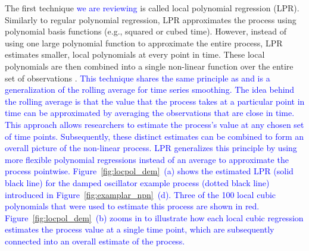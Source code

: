 \documentclass[man, floatsintext]{apa7}
\begin{document}
The first technique \textcolor{blue}{we are reviewing} is called local
polynomial regression (LPR). Similarly to regular polynomial regression, LPR
approximates the process using polynomial basis functions (e.g., squared or
cubed time). However, instead of using one large polynomial function to
approximate the entire process, LPR estimates smaller, local polynomials at
every point in time. These local polynomials are then combined into a single
non-linear function over the entire set of observations
\parencite{fan_adaptive_1995, ruppert_multivariate_1994, fan_local_2018}.
\textcolor{blue}{This technique shares the same principle as and is a
  generalization of the rolling average for time series smoothing.
  The idea behind the rolling average is that the value that the process
  takes at a particular point in time can be approximated by averaging
  the observations that are close in time. This approach allows researchers to
  estimate
  the process's value at any chosen set of time points. Subsequently, these
  distinct
  estimates
  can be combined to form an overall picture of the non-linear
  process.
  LPR generalizes this principle by using more
  flexible polynomial regressions instead of an average to approximate the
  process pointwise.
  Figure~\ref{fig:locpol_dem}~(a) shows the estimated LPR (solid black line)
  for the damped oscillator example process (dotted black line) introduced in
  Figure~\ref{fig:examplar_npn}~(d). Three of the 100 local cubic
  polynomials that were used to estimate this process are shown in red.
  Figure~\ref{fig:locpol_dem}~(b) zooms in to
  illustrate how each local cubic regression estimates the process value at a
  single time point, which are subsequently connected into an overall estimate
  of the process.}

\begin{sidewaysfigure*}[htbp]
  \caption{Demonstration of a local polynomial regression}
  \label{fig:locpol_dem}
\end{sidewaysfigure*}
\end{document}

